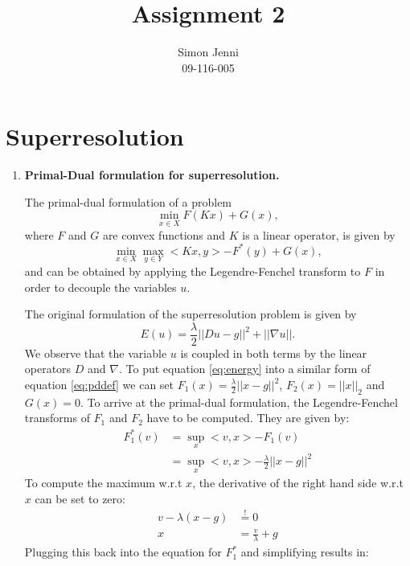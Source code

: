 \documentclass{paper}
\title{Assignment 2}
\author{Simon Jenni\\09-116-005}
\begin{document}
\maketitle


%

\section*{Superresolution}


\begin{enumerate}

\item \textbf{Primal-Dual formulation for superresolution.}

The primal-dual formulation of a problem
\begin{equation}\label{eq:pddef}
\min_{x\in X}F(Kx)+G(x),
\end{equation}
where $F$ and $G$ are convex functions and $K$ is a linear operator, is given by 
\begin{equation}
\min_{x\in X}\max_{y\in Y}<Kx,y>-F^*(y)+G(x),
\end{equation}
and can be obtained by applying the Legendre-Fenchel transform to $F$ in order to decouple the variables $u$. 


The original formulation of the superresolution problem is given by
\begin{equation}\label{eq:energy}
E(u)=\frac{\lambda}{2}||Du-g||^2+||\nabla u||.
\end{equation}
We observe that the variable $u$ is coupled in both terms by the linear operators $D$ and $\nabla$. 
To put equation \ref{eq:energy} into a similar form of equation \ref{eq:pddef} we can set $F_1(x)=\frac{\lambda}{2}||x-g||^2$, $F_2(x)=||x||_2$ and $G(x)=0$. To arrive at the primal-dual formulation, the Legendre-Fenchel transforms of $F_1$ and $F_2$ have to be computed. They are given by:
\begin{align*}
F_1^*(v) &= \sup_x<v,x>-F_1(v) \\
&=\sup_x<v,x>-\frac{\lambda}{2}||x-g||^2 
\end{align*}         
To compute the maximum w.r.t $x$, the derivative of the right hand side w.r.t $x$ can be set to zero:
\begin{align*}
v-\lambda(x-g) &\overset{!}{=} 0 \\
x &=\frac{v}{\lambda}+g
\end{align*}  
Plugging this back into the equation for $F_1^*$ and simplifying results in:


\end{enumerate}
\end{document}

